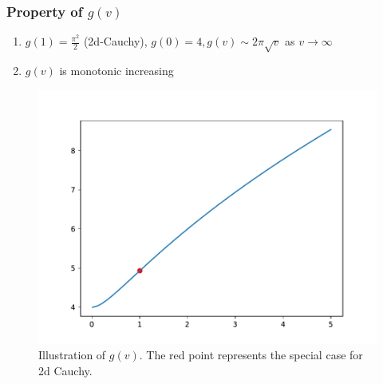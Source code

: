 \documentclass{beamer}
\begin{document}
\begin{frame}
    \frametitle{Property of $g(v)$}
    \begin{enumerate}
        \item $g(1)=\frac{\pi^2}{2}$
        (2d-Cauchy), $g(0)=4,
        g(v) \sim 2\pi \sqrt{v}$
        as $v\to \infty$
        \item $g(v)$ is monotonic increasing
    \end{enumerate}
    \begin{figure}
        \includegraphics[width=0.6\linewidth]{2d_t_distribution_g_v.pdf}
        \caption{Illustration of $g(v)$. The red point represents the special case for 2d Cauchy.}
    \end{figure}
\end{frame}
\end{document}
